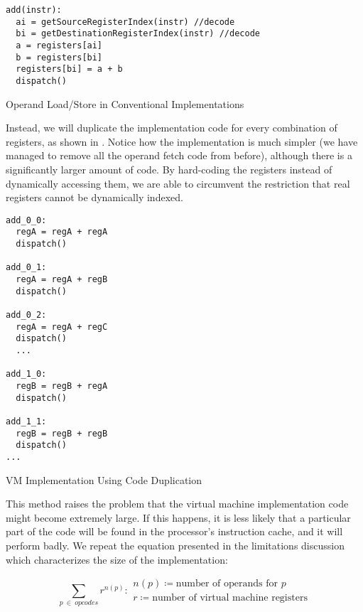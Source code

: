 	
	\begin{myfigure}
		\begin{lstlisting}
add(instr):
  ai = getSourceRegisterIndex(instr) //decode
  bi = getDestinationRegisterIndex(instr) //decode
  a = registers[ai]
  b = registers[bi]
  registers[bi] = a + b
  dispatch()
		\end{lstlisting}
		\caption{Operand Load/Store in Conventional Implementations}
		\label{fig:operandfetch}
	\end{myfigure}
	
	Instead, we will duplicate the implementation code for every combination of registers, as shown in . Notice how the implementation is much simpler (we have managed to remove all the operand fetch code from before), although there is a significantly larger amount of code. By hard-coding the registers instead of dynamically accessing them, we are able to circumvent the restriction that real registers cannot be dynamically indexed.
	
	\begin{myfigure}
		\begin{lstlisting}
add_0_0:
  regA = regA + regA
  dispatch()

add_0_1:
  regA = regA + regB
  dispatch()

add_0_2:
  regA = regA + regC
  dispatch()
  ...

add_1_0:
  regB = regB + regA
  dispatch()

add_1_1:
  regB = regB + regB
  dispatch()
...		
		\end{lstlisting}
		\caption{VM Implementation Using Code Duplication}
		\label{fig:dupimplementation}
	\end{myfigure}
	
	This method raises the problem that the virtual machine implementation code might become extremely large. If this happens, it is less likely that a particular part of the code will be found in the processor's instruction cache, and it will perform badly. We repeat the equation presented in the limitations discussion which characterizes the size of the implementation:
	
	\[
		\sum_{p~\in~opcodes} r^{n(p)} : 
		\begin{array}{l}
			n(p) \coloneqq \text{number of operands for $p$} \\
			r \coloneqq \text{number of virtual machine registers}
		\end{array}
	\] 
	

